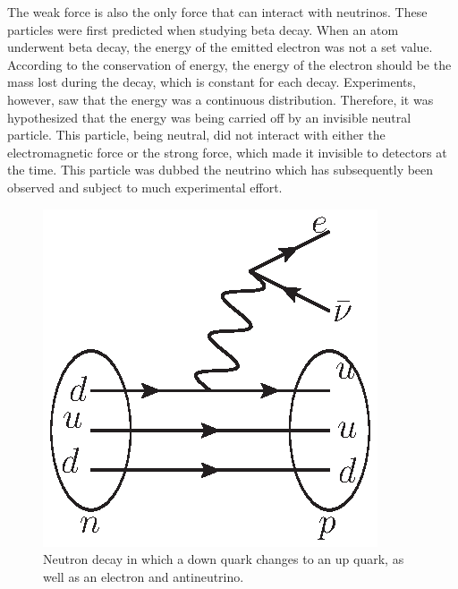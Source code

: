     The weak force is also the only force that can interact with neutrinos. These particles were first predicted when studying beta decay. When an atom underwent beta decay, the energy of the emitted electron was not a set value. According to the conservation of energy, the energy of the electron should be the mass lost during the decay, which is constant for each decay. Experiments, however, saw that the energy was a continuous distribution. Therefore, it was hypothesized that the energy  was being carried off by an invisible neutral particle. This particle, being neutral, did not interact with either the electromagnetic force or the strong force, which made it invisible to detectors at the time. This particle was dubbed the neutrino which has subsequently been observed and subject to much experimental effort.
    
    \begin{figure}[!htbp]
    \centering
    \includegraphics[width=.4\textwidth]{figures/NeutronDecay.eps}
    \caption[
        The particles of the Standard Model.
    ]{
Neutron decay in which a down quark changes to an up quark, as well as an electron and antineutrino.
    }
    \label{fig:NeutronDecay}
\end{figure}
 

 
 


  
 
